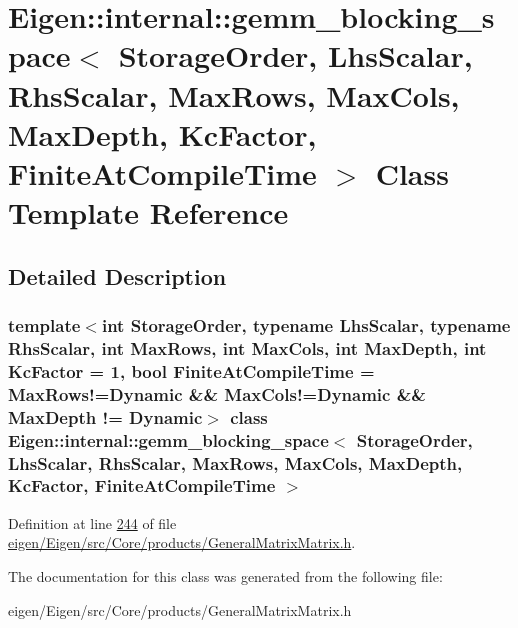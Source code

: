 \hypertarget{class_eigen_1_1internal_1_1gemm__blocking__space}{}\section{Eigen\+:\+:internal\+:\+:gemm\+\_\+blocking\+\_\+space$<$ Storage\+Order, Lhs\+Scalar, Rhs\+Scalar, Max\+Rows, Max\+Cols, Max\+Depth, Kc\+Factor, Finite\+At\+Compile\+Time $>$ Class Template Reference}
\label{class_eigen_1_1internal_1_1gemm__blocking__space}


\subsection{Detailed Description}
\subsubsection*{template$<$int Storage\+Order, typename Lhs\+Scalar, typename Rhs\+Scalar, int Max\+Rows, int Max\+Cols, int Max\+Depth, int Kc\+Factor = 1, bool Finite\+At\+Compile\+Time = Max\+Rows!=\+Dynamic \&\& Max\+Cols!=\+Dynamic \&\& Max\+Depth != Dynamic$>$\newline
class Eigen\+::internal\+::gemm\+\_\+blocking\+\_\+space$<$ Storage\+Order, Lhs\+Scalar, Rhs\+Scalar, Max\+Rows, Max\+Cols, Max\+Depth, Kc\+Factor, Finite\+At\+Compile\+Time $>$}



Definition at line \hyperlink{eigen_2_eigen_2src_2_core_2products_2_general_matrix_matrix_8h_source_l00244}{244} of file \hyperlink{eigen_2_eigen_2src_2_core_2products_2_general_matrix_matrix_8h_source}{eigen/\+Eigen/src/\+Core/products/\+General\+Matrix\+Matrix.\+h}.



The documentation for this class was generated from the following file\+:\begin{DoxyCompactItemize}
\item 
eigen/\+Eigen/src/\+Core/products/\+General\+Matrix\+Matrix.\+h\end{DoxyCompactItemize}
